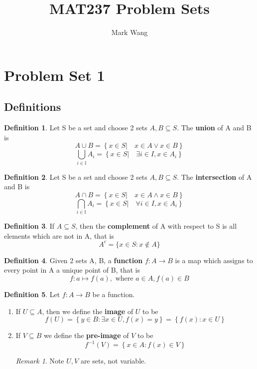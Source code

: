 \documentclass[11pt]{article}
\title{MAT237 Problem Sets}
\author{Mark Wang}
\theoremstyle{plain}%
\theoremstyle{definition}
\newtheorem{defn}{Definition}[section]
\theoremstyle{remark}
\newtheorem*{rem}{Remark}
\newcommand{\I}{\mathbb{I}}
\begin{document}
\maketitle


\section*{Problem Set 1}


\subsection*{Definitions}

\begin{defn}
  \label{union}
  Let S be a set and choose 2 sets $A, B \subseteq S$. The \textbf{union} of A and B is
  \[
    A\cup B = \left\{ x\in S | \quad x\in A \lor x\in B \right\}
  \]
  \[
    \bigcup_{i\in \I} A_i = \left\{ x\in S | \quad \exists i\in I, x\in A_i\right\}
  \]
\end{defn}

\begin{defn}
  \label{intersection}
  Let S be a set and choose 2 sets $A, B \subseteq S$. The \textbf{intersection} of A and B is
  \[
    A\cap B = \left\{ x\in S| \quad x\in A \land x\in B \right\}
  \]
  \[
    \bigcap_{i\in\I} A_i = \left\{ x\in S | \quad \forall i \in I, x\in A_i \right\}
  \]
\end{defn}

\begin{defn}
  \label{setcomplement}
  If $A\subseteq S$, then the \textbf{complement} of A with respect to S is all elements which are not in A, that is
  \[
    A^c = \{ x\in S: x\not\in A \}
  \]
\end{defn}

\begin{defn}
  \label{function}
  Given 2 sets A, B, a \textbf{function} $f: A\to B$ is a map which assigns to every point in A a unique point of B, that is
  \[
    f: a \mapsto f(a), \text{ where } a\in A, f(a)\in B
  \]
\end{defn}

\begin{defn}
  \label{image and preimage}
  Let $f: A\to B$ be a function.
  \begin{enumerate}
    \item If $U \subseteq A$, then we define the \textbf{image} of $U$ to be
    \[
      f(U) = \left\{ y\in B: \exists x\in U, f(x) = y\right\} = \left\{ f(x): x\in U\right\}
    \]

    \item If $V\subseteq B$ we define the \textbf{pre-image} of $V$ to be
    \[
      f^{-1}(V) = \left\{ x\in A: f(x) \in V\right\}
    \]
    \begin{rem}
      Note $U,V$ are sets, not variable.
    \end{rem}
  \end{enumerate}
\end{defn}
\end{document}
